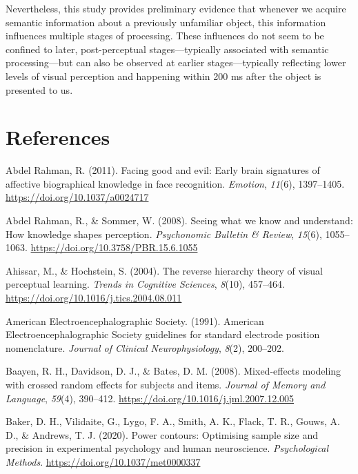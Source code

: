 \documentclass[
  english,
  man,floatsintext]{apa7}
\begin{document}
Nevertheless, this study provides preliminary evidence that whenever we acquire semantic information about a previously unfamiliar object, this information influences multiple stages of processing. These influences do not seem to be confined to later, post-perceptual stages---typically associated with semantic processing---but can also be observed at earlier stages---typically reflecting lower levels of visual perception and happening within 200 ms after the object is presented to us.

\newpage

\hypertarget{references}{%
\section{References}\label{references}}

\begingroup
\setlength{\parindent}{-0.5in}
\setlength{\leftskip}{0.5in}

\hypertarget{refs}{}
\leavevmode\hypertarget{ref-abdelrahman2011}{}%
Abdel Rahman, R. (2011). Facing good and evil: Early brain signatures of affective biographical knowledge in face recognition. \emph{Emotion}, \emph{11}(6), 1397--1405. \url{https://doi.org/10.1037/a0024717}

\leavevmode\hypertarget{ref-abdelrahman2008}{}%
Abdel Rahman, R., \& Sommer, W. (2008). Seeing what we know and understand: How knowledge shapes perception. \emph{Psychonomic Bulletin \& Review}, \emph{15}(6), 1055--1063. \url{https://doi.org/10.3758/PBR.15.6.1055}

\leavevmode\hypertarget{ref-ahissar2004}{}%
Ahissar, M., \& Hochstein, S. (2004). The reverse hierarchy theory of visual perceptual learning. \emph{Trends in Cognitive Sciences}, \emph{8}(10), 457--464. \url{https://doi.org/10.1016/j.tics.2004.08.011}

\leavevmode\hypertarget{ref-americanelectroencephalographicsociety1991}{}%
American Electroencephalographic Society. (1991). American Electroencephalographic Society guidelines for standard electrode position nomenclature. \emph{Journal of Clinical Neurophysiology}, \emph{8}(2), 200--202.

\leavevmode\hypertarget{ref-baayen2008}{}%
Baayen, R. H., Davidson, D. J., \& Bates, D. M. (2008). Mixed-effects modeling with crossed random effects for subjects and items. \emph{Journal of Memory and Language}, \emph{59}(4), 390--412. \url{https://doi.org/10.1016/j.jml.2007.12.005}

\leavevmode\hypertarget{ref-baker2020}{}%
Baker, D. H., Vilidaite, G., Lygo, F. A., Smith, A. K., Flack, T. R., Gouws, A. D., \& Andrews, T. J. (2020). Power contours: Optimising sample size and precision in experimental psychology and human neuroscience. \emph{Psychological Methods}. \url{https://doi.org/10.1037/met0000337}
\end{document}
